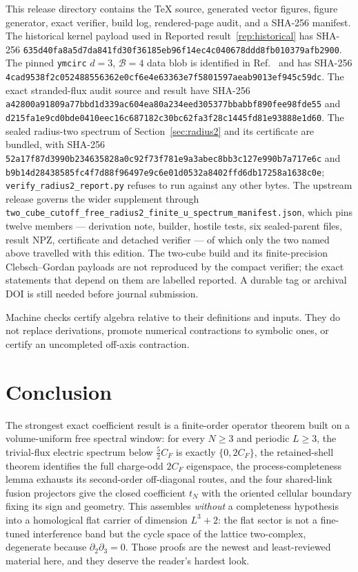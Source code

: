 \documentclass[11pt]{article}
\theoremstyle{plain}
\theoremstyle{definition}
\theoremstyle{remark}
\newcommand{\CF}{C_F}
\begin{document}
This release directory contains the TeX source, generated vector figures,
figure generator, exact verifier, build log, rendered-page audit, and a
SHA-256 manifest. The historical kernel payload used in
Reported result~\ref{rep:historical} has SHA-256
\nolinkurl{635d40fa8a5d7da841fd30f36185eb96f14ec4c040678ddd8fb010379afb2900}.
The pinned \texttt{ymcirc} $d=3$, $\mathcal B=4$ data blob is identified in
Ref.~\cite{ymcirc2026} and has SHA-256
\nolinkurl{4cad9538f2c052488556362e0cf6e4e63363e7f5801597aeab9013ef945c59dc}.
The exact stranded-flux audit source and result have SHA-256
\nolinkurl{a42800a91809a77bbd1d339ac604ea80a234eed305377bbabbf890fee98fde55}
and
\nolinkurl{d215fa1e9cd0bde0410eec16c687182c30bc62fa3f28c1445fd81e93888e1d60}.
The sealed radius-two spectrum of Section~\ref{sec:radius2} and its
certificate are bundled, with SHA-256
\nolinkurl{52a17f87d3990b234635828a0c92f73f781e9a3abec8bb3c127e990b7a717e6c}
and
\nolinkurl{b9b14d28438585fc4f7d88f96497e9c6e01d0532a8402ffd6db17258a1638c0e};
\texttt{verify\_radius2\_report.py} refuses to run against any other bytes.
The upstream release governs the wider supplement through
\texttt{two\_cube\_cutoff\_free\_radius2\_finite\_u\_spectrum\_manifest.json},
which pins twelve members --- derivation note, builder, hostile tests, six
sealed-parent files, result NPZ, certificate and detached verifier --- of
which only the two named above travelled with this edition. The two-cube build
and its finite-precision Clebsch--Gordan payloads are not reproduced by the
compact verifier; the exact statements that depend on them are labelled
reported. A durable tag or archival DOI is still needed before journal
submission.

Machine checks certify algebra relative to their definitions and inputs. They
do not replace derivations, promote numerical contractions to symbolic ones,
or certify an uncompleted off-axis contraction.

\section{Conclusion}

The strongest exact coefficient result is a finite-order operator theorem
built on a volume-uniform free spectral window: for every $N\ge3$ and periodic
$L\ge3$, the trivial-flux electric spectrum below $\tfrac52\CF$ is exactly
$\{0,2\CF\}$, the retained-shell theorem identifies the full charge-odd $2\CF$
eigenspace, the process-completeness lemma exhausts its second-order
off-diagonal routes, and the four shared-link fusion projectors give the
closed coefficient $t_N$ with the oriented cellular boundary fixing its sign
and geometry. This assembles \emph{without} a completeness hypothesis into a
homological flat carrier of dimension $L^3+2$: the flat sector is not a
fine-tuned interference band but the cycle space of the lattice two-complex,
degenerate because $\partial_2\partial_3=0$. Those proofs are the newest and
least-reviewed material here, and they deserve the reader's hardest look.
\end{document}
